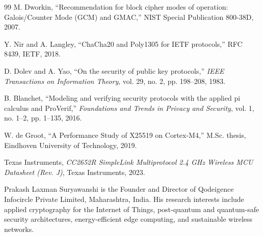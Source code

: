 \documentclass[journal]{IEEEtran}
\begin{document}
\begin{thebibliography}{99}
M. Dworkin,
``Recommendation for block cipher modes of operation: Galois/Counter Mode (GCM) and GMAC,''
NIST Special Publication 800-38D, 2007.

Y. Nir and A. Langley,
``ChaCha20 and Poly1305 for IETF protocols,''
RFC 8439, IETF, 2018.

D. Dolev and A. Yao,
``On the security of public key protocols,''
\emph{IEEE Transactions on Information Theory}, vol. 29, no. 2, pp. 198--208, 1983.

B. Blanchet,
``Modeling and verifying security protocols with the applied pi calculus and ProVerif,''
\emph{Foundations and Trends in Privacy and Security}, vol. 1, no. 1--2, pp. 1--135, 2016.

W. de Groot,
``A Performance Study of X25519 on Cortex-M4,''
M.Sc. thesis, Eindhoven University of Technology, 2019.

Texas Instruments,
\emph{CC2652R SimpleLink Multiprotocol 2.4 GHz Wireless MCU Datasheet (Rev. J)},
Texas Instruments, 2023.

\end{thebibliography}


\begin{IEEEbiographynophoto}{Prakash Laxman Suryawanshi}
is the Founder and Director of Qodeigence Infocircle Private Limited,
Maharashtra, India. His research interests include applied cryptography for the
Internet of Things, post-quantum and quantum-safe security architectures,
energy-efficient edge computing, and sustainable wireless networks.
\end{IEEEbiographynophoto}
\end{document}
